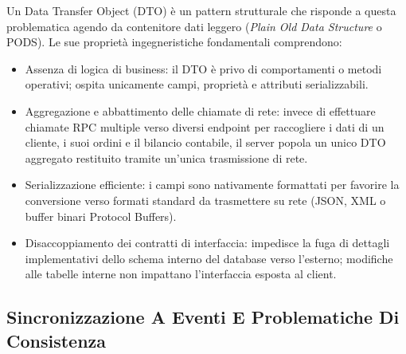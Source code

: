 \documentclass[11pt, a4paper]{article}
\begin{document}
Un Data Transfer Object (DTO) è un pattern strutturale che risponde a questa problematica agendo da contenitore dati leggero (\emph{Plain Old Data Structure} o PODS). Le sue proprietà ingegneristiche fondamentali comprendono:
\begin{itemize}[noitemsep]
    \item Assenza di logica di business: il DTO è privo di comportamenti o metodi operativi; ospita unicamente campi, proprietà e attributi serializzabili.
    \item Aggregazione e abbattimento delle chiamate di rete: invece di effettuare chiamate RPC multiple verso diversi endpoint per raccogliere i dati di un cliente, i suoi ordini e il bilancio contabile, il server popola un unico DTO aggregato restituito tramite un'unica trasmissione di rete.
    \item Serializzazione efficiente: i campi sono nativamente formattati per favorire la conversione verso formati standard da trasmettere su rete (JSON, XML o buffer binari Protocol Buffers).
    \item Disaccoppiamento dei contratti di interfaccia: impedisce la fuga di dettagli implementativi dello schema interno del database verso l'esterno; modifiche alle tabelle interne non impattano l'interfaccia esposta al client.
\end{itemize}

\subsection{Sincronizzazione A Eventi E Problematiche Di Consistenza}

\end{document}
